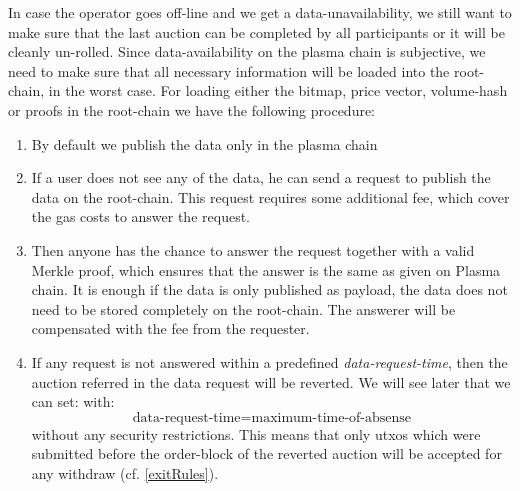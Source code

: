 \documentclass[11pt,parskip=full]{scrartcl}%
\begin{document}
\label{enforceAvailablity}
In case the operator goes off-line and we get a data-unavailability, we still want to make sure that the last auction can be completed by all participants or it will be cleanly un-rolled. 
Since data-availability on the plasma chain is subjective, we need to make sure that all necessary information will be loaded into the root-chain, in the worst case. \newline
For loading either the bitmap, price vector, volume-hash or proofs in the root-chain we have the following procedure:
\begin{enumerate}
\item By default we publish the data only in the plasma chain
\item If a user does not see any of the data, he can send a request to publish the data on the root-chain. This request requires some additional fee, which cover the gas costs to answer the request.
\item Then anyone has the chance to answer the request together with a valid Merkle proof, which ensures that the answer is the same as given on Plasma chain. It is enough if the data is only published as payload, the data does not need to be stored completely on the root-chain. The answerer will be compensated with the fee from the requester.
\item If any request is not answered within a predefined \emph{data-request-time}, then the auction referred in the data request will be reverted. We will see later that we can set:
with: \begin{equation}
\text{data-request-time}=\text{maximum-time-of-absense}
\end{equation}
without any security restrictions.
This means that only utxos which were submitted before the order-block of the reverted auction will be accepted for any withdraw (cf. \ref{exitRules}). 
\end{enumerate}
\end{document}
